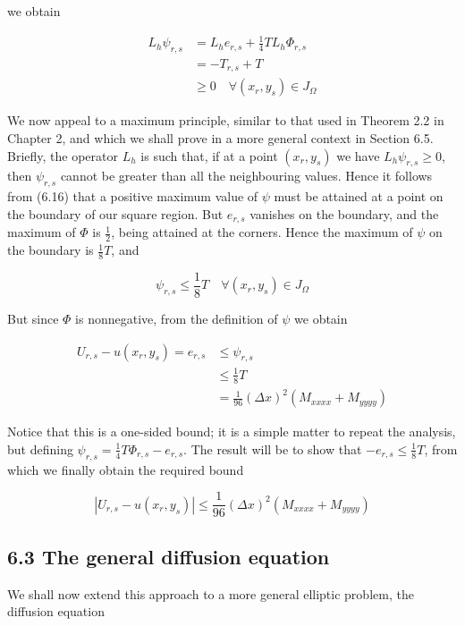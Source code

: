 \documentclass[10pt]{article}
\begin{document}
we obtain

\[
\begin{aligned}
L_{h} \psi_{r, s} & =L_{h} e_{r, s}+\frac{1}{4} T L_{h} \Phi_{r, s} \\
& =-T_{r, s}+T \\
& \geq 0 \quad \forall\left(x_{r}, y_{s}\right) \in J_{\Omega}
\end{aligned}
\]

We now appeal to a maximum principle, similar to that used in Theorem 2.2 in Chapter 2, and which we shall prove in a more general context in Section 6.5. Briefly, the operator \(L_{h}\) is such that, if at a point \(\left(x_{r}, y_{s}\right)\) we have \(L_{h} \psi_{r, s} \geq 0\), then \(\psi_{r, s}\) cannot be greater than all the neighbouring values. Hence it follows from (6.16) that a positive maximum value of \(\psi\) must be attained at a point on the boundary of our square region. But \(e_{r, s}\) vanishes on the boundary, and the maximum of \(\Phi\) is \(\frac{1}{2}\), being attained at the corners. Hence the maximum of \(\psi\) on the boundary is \(\frac{1}{8} T\), and

\[
\psi_{r, s} \leq \frac{1}{8} T \quad \forall\left(x_{r}, y_{s}\right) \in J_{\Omega}
\]

But since \(\Phi\) is nonnegative, from the definition of \(\psi\) we obtain

\[
\begin{aligned}
U_{r, s}-u\left(x_{r}, y_{s}\right)=e_{r, s} & \leq \psi_{r, s} \\
& \leq \frac{1}{8} T \\
& =\frac{1}{96}(\Delta x)^{2}\left(M_{x x x x}+M_{y y y y}\right)
\end{aligned}
\]

Notice that this is a one-sided bound; it is a simple matter to repeat the analysis, but defining \(\psi_{r, s}=\frac{1}{4} T \Phi_{r, s}-e_{r, s}\). The result will be to show that \(-e_{r, s} \leq \frac{1}{8} T\), from which we finally obtain the required bound

\[
\left|U_{r, s}-u\left(x_{r}, y_{s}\right)\right| \leq \frac{1}{96}(\Delta x)^{2}\left(M_{x x x x}+M_{y y y y}\right)
\]

\subsection*{6.3 The general diffusion equation}
We shall now extend this approach to a more general elliptic problem, the diffusion equation
\end{document}

